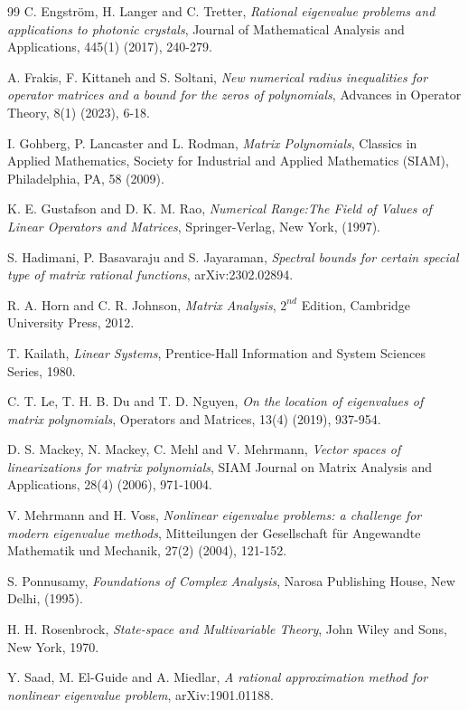 \documentclass[12pt, reqno]{amsart}
\theoremstyle{definition}
\theoremstyle{remark}
\numberwithin{equation}{section}
\begin{document}
\begin{thebibliography}{99}
C. Engstr\"{o}m, H. Langer and C. Tretter, \emph{Rational eigenvalue problems and 
applications to photonic crystals}, Journal of Mathematical Analysis and Applications, 
445(1) (2017), 240-279.

A. Frakis, F. Kittaneh and S. Soltani, \emph{New numerical radius inequalities 
for operator matrices and a bound for the zeros of polynomials}, Advances in 
Operator Theory, 8(1) (2023), 6-18.

I. Gohberg, P. Lancaster and L. Rodman, \emph{Matrix Polynomials}, Classics in Applied 
Mathematics, Society for Industrial and Applied Mathematics (SIAM), Philadelphia, PA, 58 (2009).

K. E. Gustafson and D. K. M. Rao, \emph{Numerical Range:The Field of Values of Linear 
Operators and Matrices}, Springer-Verlag, New York, (1997).

S. Hadimani, P. Basavaraju and S. Jayaraman, \emph{Spectral bounds for certain special 
type of matrix rational functions}, arXiv:2302.02894.

R. A. Horn and C. R. Johnson, \emph{Matrix Analysis}, $2^{nd}$ Edition, 
Cambridge University Press, 2012.

T. Kailath, \emph{Linear Systems}, Prentice-Hall Information and System Sciences Series, 
1980.

C. T. Le, T. H. B. Du and T. D. Nguyen, \emph{On the location of eigenvalues of matrix 
polynomials}, Operators and Matrices, 13(4) (2019), 937-954.

D. S. Mackey, N. Mackey, C. Mehl and V. Mehrmann, \emph{Vector spaces of linearizations 
for matrix polynomials}, SIAM Journal on Matrix Analysis and Applications, 28(4) (2006),
 971-1004.	

V. Mehrmann and H. Voss, \emph{Nonlinear eigenvalue problems: a challenge for modern 
eigenvalue methods}, Mitteilungen der Gesellschaft f\"{u}r Angewandte Mathematik und 
Mechanik, 27(2) (2004), 121-152.

S. Ponnusamy, \emph{Foundations of Complex Analysis}, Narosa Publishing House, New Delhi, 
(1995).

H. H. Rosenbrock, \emph{State-space and Multivariable Theory}, John Wiley and Sons, 
New York, 1970.
 	  	
Y. Saad, M. El-Guide and A. Miedlar, \emph{A rational approximation method for nonlinear 
eigenvalue problem}, arXiv:1901.01188.


\end{thebibliography}
\end{document}
